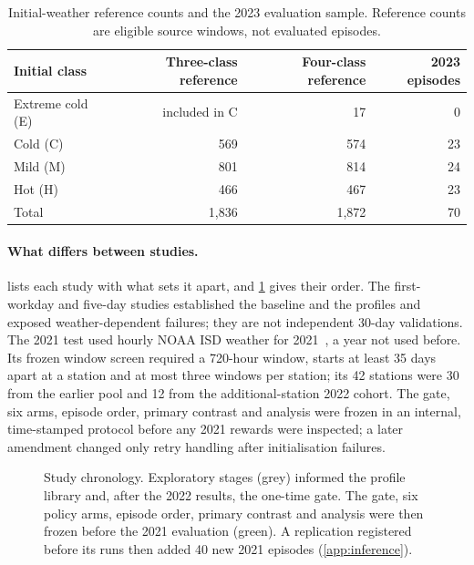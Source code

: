 \begin{table}[!htbp]
\centering
\caption{Initial-weather reference counts and the 2023 evaluation sample. Reference counts are eligible source windows,
not evaluated episodes.}
\label{tab:ref}
\small
\begin{tabular}{lrrr}
\toprule
Initial class & Three-class reference & Four-class reference & 2023 episodes\\
\midrule
Extreme cold (E) & included in C & 17  & 0\\
Cold (C)         & 569           & 574 & 23\\
Mild (M)         & 801           & 814 & 24\\
Hot (H)          & 466           & 467 & 23\\
\midrule
Total            & 1,836         & 1,872 & 70\\
\bottomrule
\end{tabular}
\end{table}

\paragraph{What differs between studies.}
 lists each study with what sets it apart, and \cref{fig:timeline} gives their order. The first-workday and
five-day studies established the baseline and the profiles and exposed weather-dependent failures; they are not independent
30-day validations. The 2021 test used hourly NOAA ISD weather for 2021~\cite{smith2011isd}, a year not used before. Its
frozen window screen required a 720-hour window, starts at least 35 days apart at a station and at most three windows per
station; its 42 stations were 30 from the earlier pool and 12 from the additional-station 2022 cohort. The gate, six arms,
episode order, primary contrast and analysis were frozen in an internal, time-stamped protocol before any 2021 rewards were
inspected; a later amendment changed only retry handling after initialisation failures.

\begin{figure}[!htbp]
\centering
\resizebox{\linewidth}{!}{}
\caption{Study chronology. Exploratory stages (grey) informed the profile library and, after the 2022 results, the
one-time gate. The gate, six policy arms, episode order, primary contrast and analysis were then frozen before the
2021 evaluation (green). A replication registered before its runs then added 40 new 2021 episodes (\cref{app:inference}).}
\label{fig:timeline}
\end{figure}

